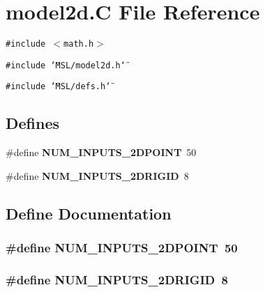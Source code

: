 \section{model2d.C File Reference}
\label{model2d_8C}
{\tt \#include $<$math.h$>$}\par
{\tt \#include \char`\"{}MSL/model2d.h\char`\"{}}\par
{\tt \#include \char`\"{}MSL/defs.h\char`\"{}}\par
\subsection*{Defines}
\begin{CompactItemize}
\item 
\#define {\bf NUM\_\-INPUTS\_\-2DPOINT}\ 50
\item 
\#define {\bf NUM\_\-INPUTS\_\-2DRIGID}\ 8
\end{CompactItemize}


\subsection{Define Documentation}
\subsubsection{\setlength{\rightskip}{0pt plus 5cm}\#define NUM\_\-INPUTS\_\-2DPOINT\ 50}\label{model2d_8C_a0}


\subsubsection{\setlength{\rightskip}{0pt plus 5cm}\#define NUM\_\-INPUTS\_\-2DRIGID\ 8}\label{model2d_8C_a1}


